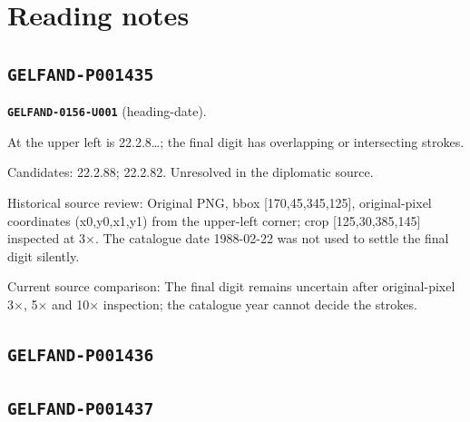 \section*{Reading notes}
\subsection*{\texttt{GELFAND-P001435}}
\par\noindent\leavevmode{}\label{GELFAND-0156-U001}\label{GELFAND-P001435:heading-date}\textbf{\texttt{GELFAND-0156-U001}} (heading-date).\nopagebreak[4]\par
At the upper left is 22.2.8…; the final digit has overlapping or intersecting strokes.\par
Candidates: 22.2.88; 22.2.82. Unresolved in the diplomatic source.\par
Historical source review: Original PNG, bbox [170,45,345,125], original-pixel coordinates (x0,y0,x1,y1) from the upper-left corner; crop [125,30,385,145] inspected at 3×. The catalogue date 1988-02-22 was not used to settle the final digit silently.\par
Current source comparison: The final digit remains uncertain after original-pixel 3×, 5× and 10× inspection; the catalogue year cannot decide the strokes.\par\medskip
\subsection*{\texttt{GELFAND-P001436}}
\subsection*{\texttt{GELFAND-P001437}}
